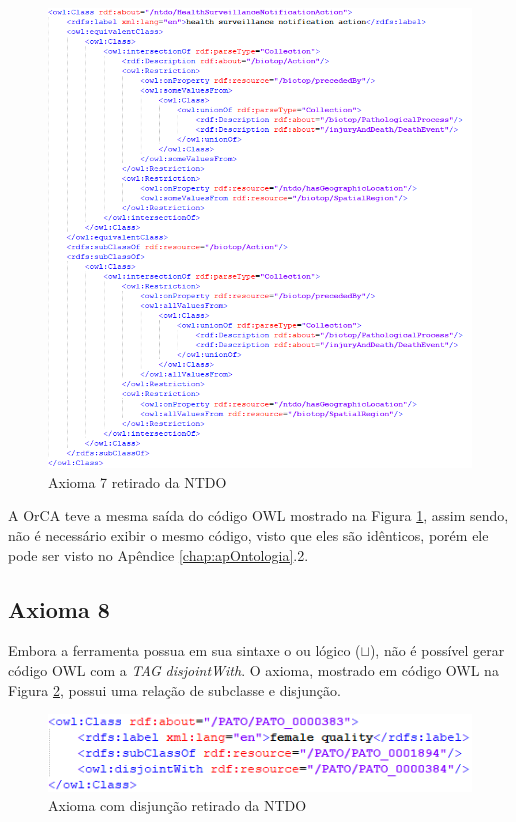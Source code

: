 \documentclass{bcc}
\begin{document}
\begin{figure}[H]
\centering
\includegraphics[width=1\textwidth]{Figuras/axioma7_o.png}
\caption{Axioma 7 retirado da NTDO} 
\label{fig:axioma7_o}
\end{figure}

A OrCA teve a mesma saída do código OWL mostrado na Figura \ref{fig:axioma7_o}, assim sendo, não é necessário exibir o mesmo código, visto que eles são idênticos, porém ele pode ser visto no Apêndice \ref{chap:apOntologia}.2.

\subsection{Axioma 8}
Embora a ferramenta possua em sua sintaxe o ou lógico ($\sqcup$), não é possível gerar código OWL com a \textit{TAG} \textit{disjointWith}. O axioma, mostrado em código OWL na Figura \ref{fig:axiomae_o}, possui uma relação de subclasse e disjunção.


\begin{figure}[H]
\centering
\includegraphics[width=.8\textwidth]{Figuras/axiomae_o.png}
\caption{Axioma com disjunção retirado da NTDO} 
\label{fig:axiomae_o}
\end{figure}
\end{document}

